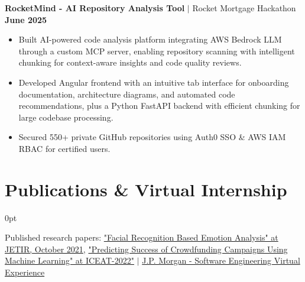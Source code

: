 \documentclass[letterpaper,10pt]{article}
\newlength{\contentindent}
\newcommand{\sectioncontent}[1]{%
  \begin{adjustwidth}{\contentindent}{0pt}%
  #1%
  \end{adjustwidth}%
}
\begin{document}
{\textbf{RocketMind - AI Repository Analysis Tool} $|$ Rocket Mortgage Hackathon \hfill \textbf{June 2025}
\begin{itemize}
    \item Built AI-powered code analysis platform integrating AWS Bedrock LLM through a custom MCP server, enabling repository scanning with intelligent chunking for context-aware insights and code quality reviews.
    \item Developed Angular frontend with an intuitive tab interface for onboarding documentation, architecture diagrams, and automated code recommendations, plus a Python FastAPI backend with efficient chunking for large codebase processing.
    \item Secured 550+ private GitHub repositories using Auth0 SSO \& AWS IAM RBAC for certified users.
\end{itemize}
}

\section{Publications \& Virtual Internship}
\sectioncontent{
{Published research papers: \href{https://www.jetir.org/view?paper=JETIRFD06059}{"Facial Recognition Based Emotion Analysis" at JETIR, October 2021}},  \href{https://drive.google.com/file/d/1oAuZegjDGTgZXc2WC4bzxeZQ2XF0wVNs/view?usp=sharing}{"Predicting Success of Crowdfunding Campaigns Using Machine Learning" at ICEAT-2022"} $|$
\href{https://drive.google.com/file/d/1KVM6ewcn56FYNm9yJX6cdct4bhXv-Cez/view?usp=sharing}{J.P. Morgan - Software Engineering Virtual Experience}
}
\end{document}
